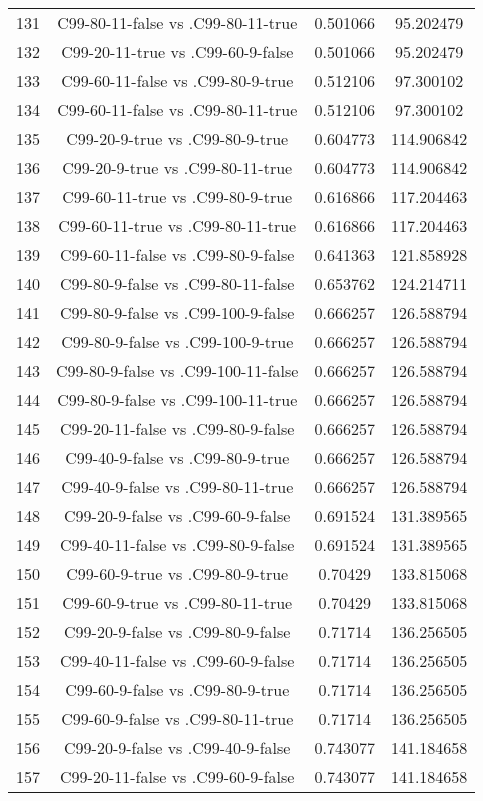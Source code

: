 \documentclass[a4paper,10pt]{article}
\begin{document}
\begin{landscape}
\begin{table}[!htp]
\begin{tabular}{cccc}
131&C99-80-11-false vs .C99-80-11-true&0.501066&95.202479\\
132&C99-20-11-true vs .C99-60-9-false&0.501066&95.202479\\
133&C99-60-11-false vs .C99-80-9-true&0.512106&97.300102\\
134&C99-60-11-false vs .C99-80-11-true&0.512106&97.300102\\
135&C99-20-9-true vs .C99-80-9-true&0.604773&114.906842\\
136&C99-20-9-true vs .C99-80-11-true&0.604773&114.906842\\
137&C99-60-11-true vs .C99-80-9-true&0.616866&117.204463\\
138&C99-60-11-true vs .C99-80-11-true&0.616866&117.204463\\
139&C99-60-11-false vs .C99-80-9-false&0.641363&121.858928\\
140&C99-80-9-false vs .C99-80-11-false&0.653762&124.214711\\
141&C99-80-9-false vs .C99-100-9-false&0.666257&126.588794\\
142&C99-80-9-false vs .C99-100-9-true&0.666257&126.588794\\
143&C99-80-9-false vs .C99-100-11-false&0.666257&126.588794\\
144&C99-80-9-false vs .C99-100-11-true&0.666257&126.588794\\
145&C99-20-11-false vs .C99-80-9-false&0.666257&126.588794\\
146&C99-40-9-false vs .C99-80-9-true&0.666257&126.588794\\
147&C99-40-9-false vs .C99-80-11-true&0.666257&126.588794\\
148&C99-20-9-false vs .C99-60-9-false&0.691524&131.389565\\
149&C99-40-11-false vs .C99-80-9-false&0.691524&131.389565\\
150&C99-60-9-true vs .C99-80-9-true&0.70429&133.815068\\
151&C99-60-9-true vs .C99-80-11-true&0.70429&133.815068\\
152&C99-20-9-false vs .C99-80-9-false&0.71714&136.256505\\
153&C99-40-11-false vs .C99-60-9-false&0.71714&136.256505\\
154&C99-60-9-false vs .C99-80-9-true&0.71714&136.256505\\
155&C99-60-9-false vs .C99-80-11-true&0.71714&136.256505\\
156&C99-20-9-false vs .C99-40-9-false&0.743077&141.184658\\
157&C99-20-11-false vs .C99-60-9-false&0.743077&141.184658\\

\end{tabular}
\end{table}
\end{landscape}
\end{document}
